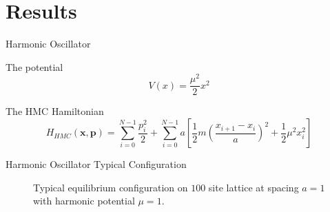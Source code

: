 \documentclass{beamer}
\begin{document}
\section{Results}
    \begin{frame}{Harmonic Oscillator}
        {
        \begin{block}{The potential}
            \begin{equation*}
            V\left(x\right) = \frac{\mu^2}{2}x^2
            \end{equation*}
        \end{block}
        }
        {
        \begin{block}{The HMC Hamiltonian}
            \begin{equation*}
            H_{HMC}\left(\bm{x},\bm{p}\right) = \sum_{i=0}^{N-1} \frac{p_i^2}{2} + \sum_{i=0}^{N-1} a \left[\frac{1}{2}m\left(\frac{x_{i+1}-x_{i}}{a}\right)^2 + \frac{1}{2}\mu^2x_i^2\right]
            \end{equation*}
        \end{block}
        }
    \end{frame}
    
    \begin{frame}{Harmonic Oscillator Typical Configuration}
        {
            \begin{figure}
                    \centering
                        \label{fig:TypicalHarmonicPath}
                        \caption{Typical equilibrium configuration on $100$ site lattice at spacing $a=1$ with harmonic potential $\mu=1$.}
                \end{figure}
        }
    \end{frame}
\end{document}
